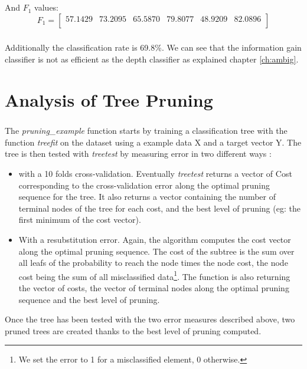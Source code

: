 \documentclass[a4paper,12pt,oneside,final]{report}
\begin{document}
\paragraph{}
And $F_{1}$ values: 
\[
F_{1} = \left[\begin{array}{cccccc}
57.1429  & 73.2095 &  65.5870  & 79.8077  & 48.9209  & 82.0896 \\
\end{array}
\right]
\]
\paragraph{}
Additionally the classification rate is 69.8\%. We can see that the information gain classifier is not as efficient as the depth classifier as explained chapter \ref{ch:ambig}.



\chapter{Analysis of Tree Pruning}
\paragraph{}
The \textit{pruning\_example} function starts by training a classification tree with the function \textit{treefit} on the dataset using a example data X and a target vector Y. The tree is then tested with \textit{treetest} by measuring error in two different ways :
\begin{itemize}
\item with a 10 folds cross-validation. Eventually \textit{treetest} returns a vector of Cost corresponding to the cross-validation error along the optimal pruning sequence for the tree. It also returns a vector containing the number of terminal nodes of the tree for each cost, and the best level of pruning (eg: the first minimum of the cost vector).
\item With a resubstitution error. Again, the algorithm computes the cost vector along the optimal pruning sequence. The cost of the subtree is the sum over all leafs of the probability to reach the node times the node cost, the node cost being the sum of all misclassified data\footnote{We set the error to 1 for a misclassified element, 0 otherwise.}.
The function is also returning the vector of costs, the vector of terminal nodes along the optimal pruning sequence and the best level of pruning.
\end{itemize}
Once the tree has been tested with the two error measures described above, two pruned trees are created thanks to the best level of pruning computed.
\end{document}
